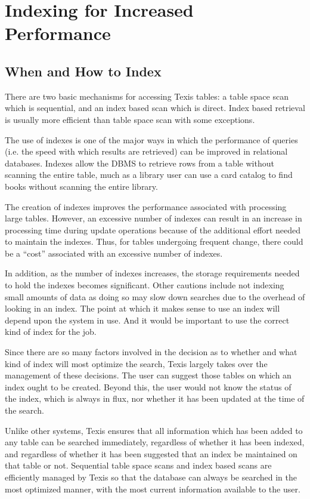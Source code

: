 
\chapter{Indexing for Increased Performance}

\section{When and How to Index}

There are two basic mechanisms for accessing Texis tables:  a table
space scan which is sequential, and an index based scan which is
direct.  Index based retrieval is usually more efficient than table
space scan with some exceptions.

The use of indexes is one of the major ways in which the performance
of queries (i.e. the speed with which results are retrieved) can be
improved in relational databases.  Indexes allow the DBMS to retrieve
rows from a table without scanning the entire table, much as a library
user can use a card catalog to find books without scanning the entire
library.

The creation of indexes improves the performance associated with
processing large tables.  However, an excessive number of indexes can
result in an increase in processing time during update operations
because of the additional effort needed to maintain the indexes.
Thus, for tables undergoing frequent change, there could be a ``cost''
associated with an excessive number of indexes.

In addition, as the number of indexes increases, the storage
requirements needed to hold the indexes becomes significant.  Other
cautions include not indexing small amounts of data as doing so may
slow down searches due to the overhead of looking in an index.  The
point at which it makes sense to use an index will depend upon the
system in use.  And it would be important to use the correct kind of
index for the job.

Since there are so many factors involved in the decision as to whether
and what kind of index will most optimize the search, Texis largely
takes over the management of these decisions.  The user can suggest
those tables on which an index ought to be created.  Beyond this, the
user would not know the status of the index, which is always in flux,
nor whether it has been updated at the time of the search.

Unlike other systems, Texis ensures that all information which has
been added to any table can be searched immediately, regardless of
whether it has been indexed, and regardless of whether it has been
suggested that an index be maintained on that table or not.
Sequential table space scans and index based scans are efficiently
managed by Texis so that the database can always be searched in the
most optimized manner, with the most current information available to
the user.

